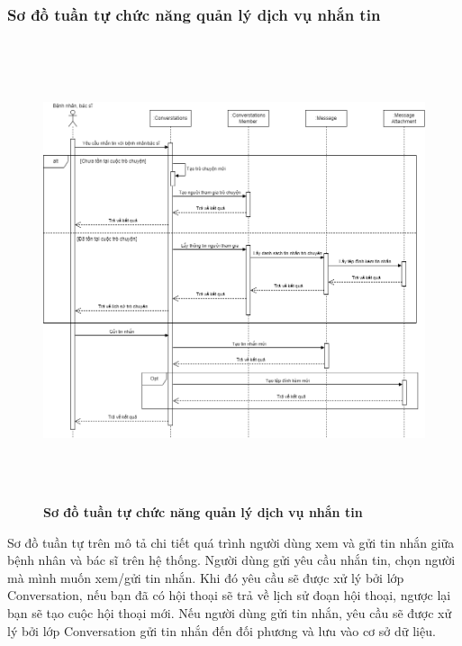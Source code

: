 \subsubsection{Sơ đồ tuần tự chức năng quản lý dịch vụ nhắn tin}
\begin{figure}[H]
  \centering
  \includegraphics[width=15cm,height=13.5cm]{Images/sequence/sequence_chat.png}
  \caption[Sơ đồ tuần tự chức năng quản lý dịch vụ nhắn tin]{\bfseries \fontsize{12pt}{0pt}
  \selectfont Sơ đồ tuần tự chức năng quản lý dịch vụ nhắn tin}
  \label{sequence_chat} %
\end{figure}
Sơ đồ tuần tự trên mô tả chi tiết quá trình người dùng xem và gửi tin nhắn giữa bệnh nhân và bác sĩ trên hệ thống. Người dùng gửi yêu cầu nhắn tin, 
chọn người mà mình muốn xem/gửi tin nhắn. Khi đó yêu cầu sẽ được xử lý bởi lớp Conversation, nếu bạn đã có hội thoại sẽ trả về lịch sử đoạn hội thoại, ngược lại bạn sẽ tạo cuộc hội thoại mới. 
Nếu người dùng gửi tin nhắn, yêu cầu sẽ được xử lý bởi lớp Conversation gửi tin nhắn đến đối phương và lưu vào cơ sở dữ liệu.

